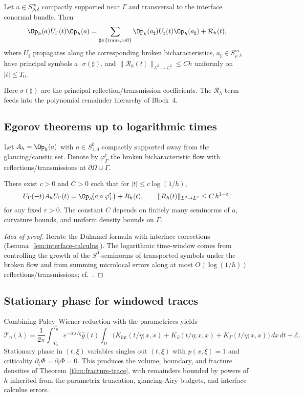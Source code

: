 \begin{lemma}
\label{lem:interface-calculus}
Let $a\in S^m_{\rho,\delta}$ compactly supported near $\Gamma$ and transversal to the interface conormal bundle. Then
\[
\Op_h(a) U_\Gamma(t) \Op_h(a) = \sum_{\sharp\in\{\mathrm{trans},\mathrm{refl}\}} \Op_h(a_\sharp) U_\sharp(t)\Op_h(a_\sharp) + \mathcal{R}_h(t),
\]
where $U_\sharp$ propagates along the corresponding broken bicharacteristics, $a_\sharp\in S^m_{\rho,\delta}$ have principal symbols $a\cdot \sigma(\sharp)$, and $\|\mathcal{R}_h(t)\|_{L^2\to L^2}\le C h$ uniformly on $|t|\le T_0$.
\end{lemma}

Here $\sigma(\sharp)$ are the principal reflection/transmission coefficients. The $\mathcal{R}_h$-term feeds into the polynomial remainder hierarchy of Block~4.

\subsection{Egorov theorems up to logarithmic times}
\label{subsec:egorov}
Let $A_h=\Op_h(a)$ with $a\in S^0_{1,0}$ compactly supported away from the glancing/caustic set. Denote by $\varphi_\Gamma^t$ the broken bicharacteristic flow with reflections/transmissions at $\partial\Omega\cup\Gamma$.

\begin{theorem}
\label{thm:egorov}
There exist $c>0$ and $C>0$ such that for $|t|\le c\log(1/h)$,
\[
U_\Gamma(-t) A_h U_\Gamma(t) = \Op_h\!\big(a\circ \varphi_\Gamma^t\big) + R_h(t),
\qquad \|R_h(t)\|_{L^2\to L^2}\le C\, h^{1-\varepsilon},
\]
for any fixed $\varepsilon>0$. The constant $C$ depends on finitely many seminorms of $a$, curvature bounds, and uniform density bounds on $\Gamma$.
\end{theorem}

\begin{proof}[Idea of proof]
Iterate the Duhamel formula with interface corrections (Lemma~\ref{lem:interface-calculus}). The logarithmic time-window comes from controlling the growth of the $S^0$-seminorms of transported symbols under the broken flow and from summing microlocal errors along at most $O(\log(1/h))$ reflections/transmissions; cf.\ \cite{NZw,Zworski}.
\end{proof}

\subsection{Stationary phase for windowed traces}
\label{subsec:stationary-phase}
Combining Paley--Wiener reduction with the parametrices yields
\[
\mathcal{T}_\eta(\lambda)=\frac{1}{2\pi}\!\int_{-T_0}^{T_0}\!\! e^{-it\lambda/\eta}\widehat{g}(t)\!\int_\Omega \Big( K_\mathrm{int}(t/\eta;x,x)+K_{\partial}(t/\eta;x,x)+K_{\Gamma}(t/\eta;x,x)\Big)\,dx\,dt + \mathcal{E}.
\]
Stationary phase in $(t,\xi)$ variables singles out $(t,\xi)$ with $p(x,\xi)=1$ and criticality $\partial_\xi \Phi=\partial_t\Phi=0$. This produces the volume, boundary, and fracture densities of Theorem~\ref{thm:fracture-trace}, with remainders bounded by powers of $h$ inherited from the parametrix truncation, glancing-Airy budgets, and interface calculus errors.

